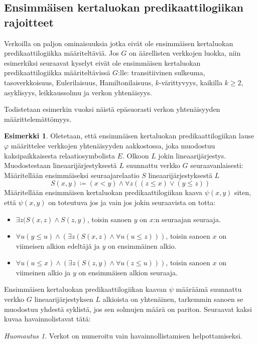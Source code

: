 \documentclass[finnish]{tktltiki2}
\theoremstyle{definition}
\newtheorem{esim}[lau]{Esimerkki}
\theoremstyle{remark}
\newtheorem*{huom}{Huomautus}
\begin{document}
\subsection{Ensimmäisen kertaluokan predikaattilogiikan rajoitteet}
Verkoilla on paljon ominaisuuksia jotka eivät ole ensimmäisen kertaluokan predikaattilogiikka määriteltäviä. Jos $G$ on äärellisten verkkojen luokka, niin esimerkiksi seuraavat kyselyt eivät ole ensimmäisen kertaluokan predikaattilogiikka määriteltävissä $G$:lle: transitiivinen sulkeuma, tasoverkkoisuus, Eulerilaisuus, Hamiltonilaisuus, $k$-värittyvyys, kaikilla $ k \geq 2$, asyklisyys, leikkaussolmu ja verkon yhtenäisyys.

Todistetaan esimerkin vuoksi näistä epäsuorasti verkon yhtenäisyyden määrittelemättömyys.
\begin{esim}
Oletetaan, että ensimmäisen kertaluokan predikaattilogiikan lause $\varphi$ määrittelee verkkojen yhtenäisyyden aakkostossa, joka muodostuu kaksipaikkaisesta relaatiosymbolista $E$. Olkoon $L$ jokin lineaarijärjestys. Muodostestaan lineaarijärjestyksestä $L$ suunnattu verkko $G$ seuraavanlaisesti: Määritellään ensimmäiseksi seuraajarelaatio $S$ lineaarijärjestyksestä $L$ \[S(x, y) \coloneqq (x < y) \land \forall z ((z \leq x) \lor (y \leq z))\]
Määritellään ensimmäisen kertaluokan predikaattilogiikan kaava $\psi(x, y)$ siten, että $\psi(x, y)$ on toteutuva jos ja vain jos jokin seuraavista on totta:
\begin{itemize}
\item $\exists z (S(x, z) \land S(z, y)$, toisin sanoen $y$ on $x$:n seuraajan seuraaja.
\item $\forall u (y \leq u) \land (\exists z(S(x, z) \land \forall u(u \leq z)))$, toisin sanoen $x$ on viimeisen alkion edeltäjä ja $y$ on ensimmäinen alkio.
\item $\forall u (u \leq x) \land (\exists z(S(z, y) \land \forall u(z \leq u)))$, toisin sanoen $x$ on viimeinen alkio ja $y$ on ensimmäisen alkion seuraaja.
\end{itemize}
Ensimmäisen kertaluokan predikaattilogiikan kaavan $\psi$ määräämä suunnattu verkko $G$ lineaarijärjestyksen $L$ alkioista on yhtenäinen, tarkemmin sanoen se muodostuu yhdestä syklistä, jos sen solmujen määrä on pariton. Seuraavat kaksi kuvaa havainnolistavat tätä:

\begin{huom}
Verkot on numeroitu vain havainnollistamisen helpottamiseksi.
\end{huom}


\end{esim}
\end{document}
